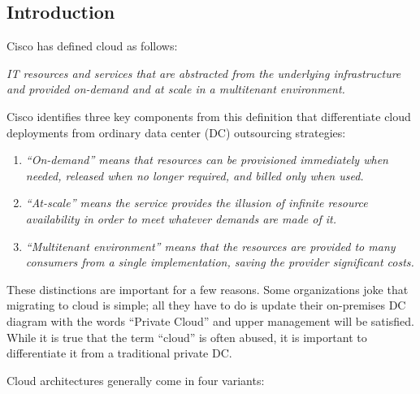 \subsection{Introduction}
Cisco has defined cloud as follows:

\textit{IT resources and services that are abstracted from the underlying
infrastructure and provided on-demand and at scale in a multitenant environment.}

Cisco identifies three key components from this definition that differentiate
cloud deployments from ordinary data center (DC) outsourcing strategies:

\begin{enumerate}
  \item \textit{``On-demand'' means that resources can be provisioned
  immediately when needed, released when no longer required, and billed only
  when used.}
  \item \textit{``At-scale'' means the service provides the illusion of
  infinite resource availability in order to meet whatever demands are made of it.}
  \item \textit{``Multitenant environment'' means that the resources are
  provided to many consumers from a single implementation, saving the provider
  significant costs.}
\end{enumerate}

These distinctions are important for a few reasons. Some organizations joke that
migrating to cloud is simple; all they have to do is update their on-premises
DC diagram with the words ``Private Cloud'' and upper management will be
satisfied. While it is true that the term ``cloud'' is often abused, it is
important to differentiate it from a traditional private DC\@.

Cloud architectures generally come in four variants:

